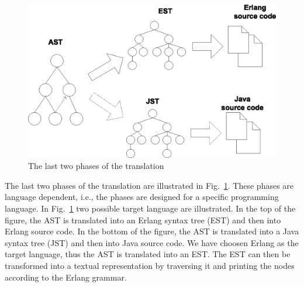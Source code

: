 \begin{figure}
\centering
\includegraphics[scale=0.75]{translation/graphics/phasesfigure02.eps}
\caption{The last two phases of the translation}
\label{fig:translationphases45}
\end{figure}

The last two phases of the translation are illustrated in Fig.~\ref{fig:translationphases45}. These phases are language dependent, i.e., the phases are designed for a specific programming language. In Fig.~\ref{fig:translationphases45} two possible target language are illustrated. In the top of the figure, the AST is translated into an Erlang syntax tree (EST) and then into Erlang source code. In the bottom of the figure, the AST is translated into a Java syntax tree (JST) and then into Java source code. We have choosen Erlang as the target language, thus the AST is translated into an EST. The EST can then be transformed into a textual representation by traversing it and printing the nodes according to the Erlang grammar.






